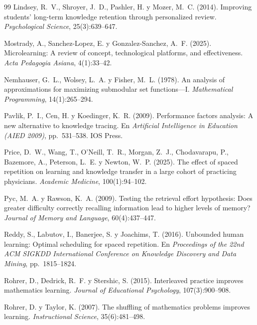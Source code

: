 \documentclass[12pt]{article}
\theoremstyle{definition}
\begin{document}
\begin{thebibliography}{99}
Lindsey, R.~V., Shroyer, J.~D., Pashler, H. y Mozer, M.~C. (2014).
\newblock Improving students' long-term knowledge retention through personalized review.
\newblock \emph{Psychological Science}, 25(3):639--647.

Mostrady, A., Sanchez-Lopez, E. y Gonzalez-Sanchez, A.~F. (2025).
\newblock Microlearning: A review of concept, technological platforms, and effectiveness.
\newblock \emph{Acta Pedagogia Asiana}, 4(1):33--42.

Nemhauser, G.~L., Wolsey, L.~A. y Fisher, M.~L. (1978).
\newblock An analysis of approximations for maximizing submodular set functions---I.
\newblock \emph{Mathematical Programming}, 14(1):265--294.

Pavlik, P.~I., Cen, H. y Koedinger, K.~R. (2009).
\newblock Performance factors analysis: A new alternative to knowledge tracing.
\newblock En \emph{Artificial Intelligence in Education (AIED 2009)}, pp.~531--538. IOS Press.

Price, D.~W., Wang, T., O'Neill, T.~R., Morgan, Z.~J., Chodavarapu, P., Bazemore, A., Peterson, L.~E. y Newton, W.~P. (2025).
\newblock The effect of spaced repetition on learning and knowledge transfer in a large cohort of practicing physicians.
\newblock \emph{Academic Medicine}, 100(1):94--102.

Pyc, M.~A. y Rawson, K.~A. (2009).
\newblock Testing the retrieval effort hypothesis: Does greater difficulty correctly recalling information lead to higher levels of memory?
\newblock \emph{Journal of Memory and Language}, 60(4):437--447.

Reddy, S., Labutov, I., Banerjee, S. y Joachims, T. (2016).
\newblock Unbounded human learning: Optimal scheduling for spaced repetition.
\newblock En \emph{Proceedings of the 22nd ACM SIGKDD International Conference on Knowledge Discovery and Data Mining}, pp.~1815--1824.

Rohrer, D., Dedrick, R.~F. y Stershic, S. (2015).
\newblock Interleaved practice improves mathematics learning.
\newblock \emph{Journal of Educational Psychology}, 107(3):900--908.

Rohrer, D. y Taylor, K. (2007).
\newblock The shuffling of mathematics problems improves learning.
\newblock \emph{Instructional Science}, 35(6):481--498.


\end{thebibliography}
\end{document}
